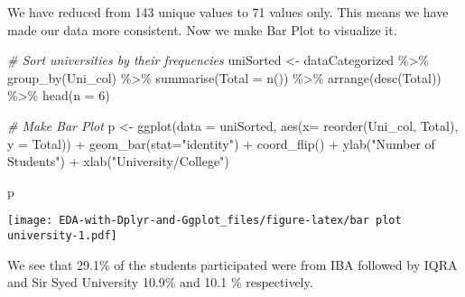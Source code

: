 \documentclass[
]{article}
\newenvironment{Shaded}{\begin{snugshade}}{\end{snugshade}}
\newcommand{\AttributeTok}[1]{\textcolor[rgb]{0.77,0.63,0.00}{#1}}
\newcommand{\CommentTok}[1]{\textcolor[rgb]{0.56,0.35,0.01}{\textit{#1}}}
\newcommand{\DecValTok}[1]{\textcolor[rgb]{0.00,0.00,0.81}{#1}}
\newcommand{\FunctionTok}[1]{\textcolor[rgb]{0.00,0.00,0.00}{#1}}
\newcommand{\NormalTok}[1]{#1}
\newcommand{\OtherTok}[1]{\textcolor[rgb]{0.56,0.35,0.01}{#1}}
\newcommand{\SpecialCharTok}[1]{\textcolor[rgb]{0.00,0.00,0.00}{#1}}
\newcommand{\StringTok}[1]{\textcolor[rgb]{0.31,0.60,0.02}{#1}}
\begin{document}
We have reduced from 143 unique values to 71 values only. This means we
have made our data more consistent. Now we make Bar Plot to visualize
it.

\begin{Shaded}
\begin{Highlighting}[]
\CommentTok{\# Sort universities by their frequencies}
\NormalTok{uniSorted }\OtherTok{\textless{}{-}}\NormalTok{ dataCategorized }\SpecialCharTok{\%\textgreater{}\%} 
  \FunctionTok{group\_by}\NormalTok{(Uni\_col) }\SpecialCharTok{\%\textgreater{}\%}
  \FunctionTok{summarise}\NormalTok{(}\AttributeTok{Total =} \FunctionTok{n}\NormalTok{()) }\SpecialCharTok{\%\textgreater{}\%}
  \FunctionTok{arrange}\NormalTok{(}\FunctionTok{desc}\NormalTok{(Total)) }\SpecialCharTok{\%\textgreater{}\%}
  \FunctionTok{head}\NormalTok{(}\AttributeTok{n =} \DecValTok{6}\NormalTok{)}
  
\CommentTok{\# Make Bar Plot}
\NormalTok{p }\OtherTok{\textless{}{-}} \FunctionTok{ggplot}\NormalTok{(}\AttributeTok{data =}\NormalTok{ uniSorted, }\FunctionTok{aes}\NormalTok{(}\AttributeTok{x=} \FunctionTok{reorder}\NormalTok{(Uni\_col, Total), }\AttributeTok{y =}\NormalTok{ Total)) }\SpecialCharTok{+} 
  \FunctionTok{geom\_bar}\NormalTok{(}\AttributeTok{stat=}\StringTok{"identity"}\NormalTok{) }\SpecialCharTok{+}
  \FunctionTok{coord\_flip}\NormalTok{() }\SpecialCharTok{+}
  \FunctionTok{ylab}\NormalTok{(}\StringTok{"Number of Students"}\NormalTok{) }\SpecialCharTok{+}
  \FunctionTok{xlab}\NormalTok{(}\StringTok{"University/College"}\NormalTok{) }
  
\NormalTok{p}
\end{Highlighting}
\end{Shaded}

\texttt{[image: EDA-with-Dplyr-and-Ggplot\_files/figure-latex/bar plot university-1.pdf]}

We see that 29.1\% of the students participated were from IBA followed
by IQRA and Sir Syed University 10.9\% and 10.1 \% respectively.
\end{document}
